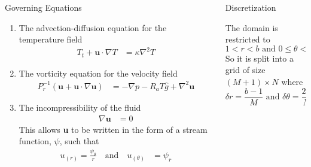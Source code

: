 \documentclass[final]{beamer}
\newlength{\onecolwid}
\newlength{\twocolwid}
\begin{document}
\begin{frame}[t]
\begin{columns}[t]
\begin{column}{\twocolwid}
\begin{columns}[t,totalwidth=\twocolwid]
\begin{column}{\onecolwid}
\begin{block}{Governing Equations}
\begin{enumerate}
	\item The advection-diffusion equation for the temperature field
	\begin{align}
		T_t + \textbf{u} \cdot \nabla T &= \kappa \nabla^2 T
	\label{eq:advectionDiffusion}
	\end{align}
	\item The vorticity equation for the velocity field
	\begin{align*}
	P_r^{−1} (\textbf{u} + \textbf{u} \cdot \nabla \textbf{u}) &= − \nabla p − R_a T\hat{g} + \nabla^2 \textbf{u}
	\end{align*}
	\item The incompressibility of the fluid
	\begin{align}
		\nabla \textbf{u} &= 0
	\end{align}
	This allows \textbf{u} to be written in the form of a stream function, $\psi$, such that
	\begin{align}
		u_{(r)} = \frac{\psi_\theta}{r}  \quad \text{and} \quad u_{(\theta)} &= \psi_r
	\label{eq:uPsi}
	\end{align}
\end{enumerate}

\end{block}


\end{column} %

\begin{column}{\onecolwid}\vspace{-.6in} %


\begin{block}{Discretization}

The domain is restricted to 
$$1 < r < b \text{ and } 0 \leq \theta < 2\pi$$
So it is split into a grid of size \\$(M+1) \times N$ where $$\delta r = \frac{b-1}{M}\text{ and }\delta \theta = \frac{2 \pi}{N}$$ 

\end{block}


\end{column}
\end{columns}
\end{column}
\end{columns}
\end{frame}
\end{document}
